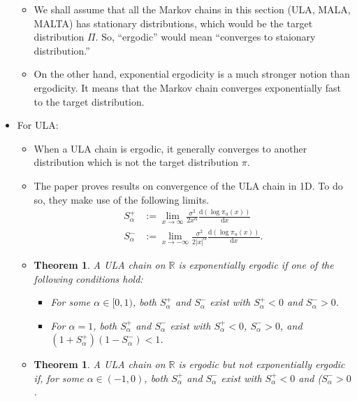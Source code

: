 \documentclass[10pt]{article}
\newtheorem{theorem}[lemma]{Theorem}
\newcommand{\dee}{\mathrm{d}}
\newcommand{\Real}{\mathbb{R}}
\begin{document}
\begin{itemize}
\begin{itemize}
    \item We shall assume that all the Markov chains in this section (ULA, MALA, MALTA) has stationary distributions, which would be the target distribution $\Pi$. So, ``ergodic'' would mean ``converges to staionary distribution.''
    
    \item On the other hand, exponential ergodicity is a much stronger notion than ergodicity. It means that the Markov chain converges exponentially fast to the target distribution.
  \end{itemize}

  \item For ULA:
  \begin{itemize}
    \item When a ULA chain is ergodic, it generally converges to another distribution which is not the target distribution $\pi$.
    
    \item The paper proves results on convergence of the ULA chain in 1D. To do so, they make use of the following limits.
    \begin{align*}
      S^+_{\alpha} &:= \lim_{x \rightarrow \infty} \frac{\sigma^2}{2 x^\alpha} \frac{\dee (\log \pi_u(x))}{\dee x} \\
      S^-_{\alpha} &:= \lim_{x \rightarrow -\infty} \frac{\sigma^2}{2 |x|^\alpha} \frac{\dee (\log \pi_u(x))}{\dee x}.
    \end{align*}

    \item \begin{theorem}
      A ULA chain on $\Real$ is exponentially ergodic if one of the following conditions hold:
      \begin{itemize}
        \item For some $\alpha \in [0,1)$, both $S^+_\alpha$ and $S^-_\alpha$ exist with $S_\alpha^+ < 0$ and $S_\alpha^- > 0$.
        \item For $\alpha = 1$, both $S^+_\alpha$ and $S^-_\alpha$ exist with $S_\alpha^+ < 0$, $S_\alpha^- > 0$, and $(1 + S_\alpha^+)(1 - S_\alpha^-) < 1$.
      \end{itemize}
    \end{theorem}

    \item \begin{theorem}
      A ULA chain on $\Real$ is ergodic but not exponentially ergodic if, for some $\alpha \in (-1,0)$, both $S^+_\alpha$ and $S^-_\alpha$ exist with $S_\alpha^+ < 0$ and ($S_\alpha^- > 0$.
    \end{theorem}


\end{itemize}
\end{itemize}
\end{document}
